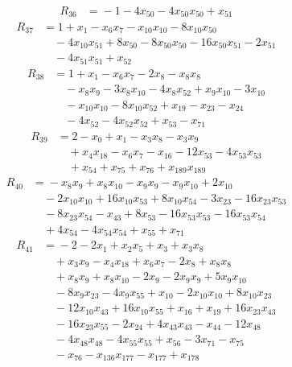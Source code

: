 \begin{align*}
R_{36}&={}-1 -4x_{50} -4x_{50}x_{50} +x_{51}
\end{align*}
\begin{align*}
R_{37}&={}1 +x_{1} -x_{6}x_{7} -x_{10}x_{10} -8x_{10}x_{50}\\
&\quad{}-4x_{10}x_{51} +8x_{50} -8x_{50}x_{50} -16x_{50}x_{51} -2x_{51}\\
&\quad{}-4x_{51}x_{51} +x_{52}
\end{align*}
\begin{align*}
R_{38}&={}1 +x_{1} -x_{6}x_{7} -2x_{8} -x_{8}x_{8}\\
&\quad{}-x_{8}x_{9} -3x_{8}x_{10} -4x_{8}x_{52} +x_{9}x_{10} -3x_{10}\\
&\quad{}-x_{10}x_{10} -8x_{10}x_{52} +x_{19} -x_{23} -x_{24}\\
&\quad{}-4x_{52} -4x_{52}x_{52} +x_{53} -x_{71}
\end{align*}
\begin{align*}
R_{39}&={}2 -x_{0} +x_{1} -x_{3}x_{8} -x_{3}x_{9}\\
&\quad{}+x_{4}x_{18} -x_{6}x_{7} -x_{16} -12x_{53} -4x_{53}x_{53}\\
&\quad{}+x_{54} +x_{75} +x_{76} +x_{189}x_{189}
\end{align*}
\begin{align*}
R_{40}&={}-x_{8}x_{9} +x_{8}x_{10} -x_{9}x_{9} -x_{9}x_{10} +2x_{10}\\
&\quad{}-2x_{10}x_{10} +16x_{10}x_{53} +8x_{10}x_{54} -3x_{23} -16x_{23}x_{53}\\
&\quad{}-8x_{23}x_{54} -x_{43} +8x_{53} -16x_{53}x_{53} -16x_{53}x_{54}\\
&\quad{}+4x_{54} -4x_{54}x_{54} +x_{55} +x_{71}
\end{align*}
\begin{align*}
R_{41}&={}-2 -2x_{1} +x_{2}x_{5} +x_{3} +x_{3}x_{8}\\
&\quad{}+x_{3}x_{9} -x_{4}x_{18} +x_{6}x_{7} -2x_{8} +x_{8}x_{8}\\
&\quad{}+x_{8}x_{9} +x_{8}x_{10} -2x_{9} -2x_{9}x_{9} +5x_{9}x_{10}\\
&\quad{}-8x_{9}x_{23} -4x_{9}x_{55} +x_{10} -2x_{10}x_{10} +8x_{10}x_{23}\\
&\quad{}-12x_{10}x_{43} +16x_{10}x_{55} +x_{16} +x_{19} +16x_{23}x_{43}\\
&\quad{}-16x_{23}x_{55} -2x_{24} +4x_{43}x_{43} -x_{44} -12x_{48}\\
&\quad{}-4x_{48}x_{48} -4x_{55}x_{55} +x_{56} -3x_{71} -x_{75}\\
&\quad{}-x_{76} -x_{136}x_{177} -x_{177} +x_{178}
\end{align*}
